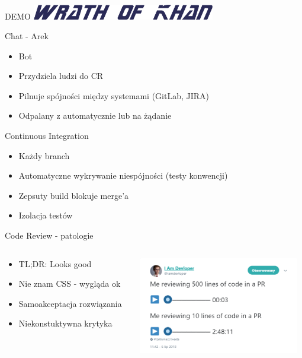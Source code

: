 \documentclass[ignorenonframetext]{beamer}
\begin{document}
\begin{frame}{DEMO}
	\centering
	\includegraphics[width=8cm]{images/wrath-of-khan.png}
\end{frame}

\begin{frame}{Chat - Arek}
\begin{itemize}
	\item Bot 
	\item Przydziela ludzi do CR
	\item Pilnuje spójności między systemami (GitLab, JIRA)
	\item Odpalany z automatycznie lub na żądanie
\end{itemize}
\end{frame}

\begin{frame}{Continuous Integration}
\begin{itemize}
	\item Każdy branch
	\item Automatyczne wykrywanie niespójności (testy konwencji)
	\item Zepsuty build blokuje merge'a
	\item Izolacja testów
\end{itemize}
\end{frame}

\begin{frame}{Code Review - patologie}
\begin{columns}
	\begin{column}{0.45\textwidth}
		\begin{itemize}
			\item TL;DR: Looks good
			\item Nie znam CSS - wygląda ok
			\item Samoakceptacja rozwiązania
			\item Niekonstuktywna krytyka
		\end{itemize}
	\end{column}
	\begin{column}{0.55\textwidth}
		\includegraphics[width=7cm]{images/cr500lines.png}
	\end{column}
\end{columns}
\end{frame}
\end{document}
